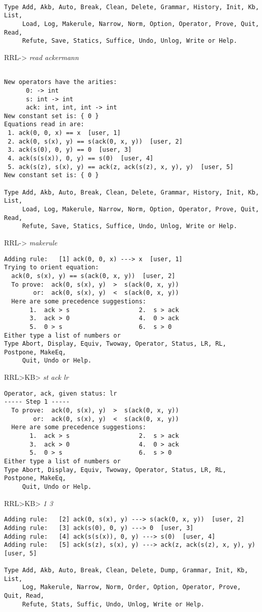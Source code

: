 \small
\tt
\begin{verbatim}
Type Add, Akb, Auto, Break, Clean, Delete, Grammar, History, Init, Kb, List,
     Load, Log, Makerule, Narrow, Norm, Option, Operator, Prove, Quit, Read,
     Refute, Save, Statics, Suffice, Undo, Unlog, Write or Help.
\end{verbatim}
RRL-> {\em read ackermann}
\begin{verbatim}

New operators have the arities:
      0: -> int
      s: int -> int
      ack: int, int, int -> int
New constant set is: { 0 }
Equations read in are:
 1. ack(0, 0, x) == x  [user, 1]
 2. ack(0, s(x), y) == s(ack(0, x, y))  [user, 2]
 3. ack(s(0), 0, y) == 0  [user, 3]
 4. ack(s(s(x)), 0, y) == s(0)  [user, 4]
 5. ack(s(z), s(x), y) == ack(z, ack(s(z), x, y), y)  [user, 5]
New constant set is: { 0 }

Type Add, Akb, Auto, Break, Clean, Delete, Grammar, History, Init, Kb, List,
     Load, Log, Makerule, Narrow, Norm, Option, Operator, Prove, Quit, Read,
     Refute, Save, Statics, Suffice, Undo, Unlog, Write or Help.
\end{verbatim}
RRL-> {\em makerule}
\begin{verbatim}
Adding rule:   [1] ack(0, 0, x) ---> x  [user, 1]
Trying to orient equation: 
  ack(0, s(x), y) == s(ack(0, x, y))  [user, 2]
  To prove:  ack(0, s(x), y)  >  s(ack(0, x, y))
        or:  ack(0, s(x), y)  <  s(ack(0, x, y))
  Here are some precedence suggestions:
       1.  ack > s                   2.  s > ack
       3.  ack > 0                   4.  0 > ack
       5.  0 > s                     6.  s > 0
Either type a list of numbers or
Type Abort, Display, Equiv, Twoway, Operator, Status, LR, RL, Postpone, MakeEq,
     Quit, Undo or Help.
\end{verbatim}
RRL>KB> {\em st ack lr}
\begin{verbatim}
Operator, ack, given status: lr
----- Step 1 -----
  To prove:  ack(0, s(x), y)  >  s(ack(0, x, y))
        or:  ack(0, s(x), y)  <  s(ack(0, x, y))
  Here are some precedence suggestions:
       1.  ack > s                   2.  s > ack
       3.  ack > 0                   4.  0 > ack
       5.  0 > s                     6.  s > 0
Either type a list of numbers or
Type Abort, Display, Equiv, Twoway, Operator, Status, LR, RL, Postpone, MakeEq,
     Quit, Undo or Help.
\end{verbatim}
RRL>KB> {\em 1 3}
\begin{verbatim}
Adding rule:   [2] ack(0, s(x), y) ---> s(ack(0, x, y))  [user, 2]
Adding rule:   [3] ack(s(0), 0, y) ---> 0  [user, 3]
Adding rule:   [4] ack(s(s(x)), 0, y) ---> s(0)  [user, 4]
Adding rule:   [5] ack(s(z), s(x), y) ---> ack(z, ack(s(z), x, y), y)  [user, 5]

Type Add, Akb, Auto, Break, Clean, Delete, Dump, Grammar, Init, Kb, List,
     Log, Makerule, Narrow, Norm, Order, Option, Operator, Prove, Quit, Read,
     Refute, Stats, Suffic, Undo, Unlog, Write or Help.
\end{verbatim}
